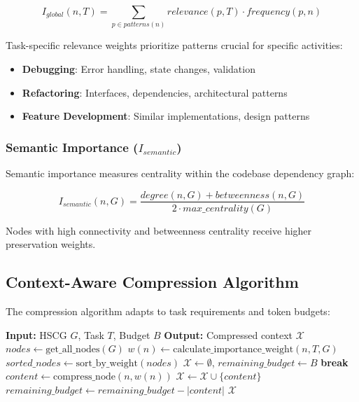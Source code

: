 \documentclass[conference]{IEEEtran}
\begin{document}
\begin{equation}
I_{global}(n, T) = \sum_{p \in patterns(n)} relevance(p, T) \cdot frequency(p, n)
\end{equation}

Task-specific relevance weights prioritize patterns crucial for specific activities:
\begin{itemize}
    \item \textbf{Debugging}: Error handling, state changes, validation
    \item \textbf{Refactoring}: Interfaces, dependencies, architectural patterns
    \item \textbf{Feature Development}: Similar implementations, design patterns
\end{itemize}

\subsubsection{Semantic Importance ($I_{semantic}$)}
Semantic importance measures centrality within the codebase dependency graph:

\begin{equation}
I_{semantic}(n, G) = \frac{degree(n, G) + betweenness(n, G)}{2 \cdot max\_centrality(G)}
\end{equation}

Nodes with high connectivity and betweenness centrality receive higher preservation weights.

\subsection{Context-Aware Compression Algorithm}

The compression algorithm adapts to task requirements and token budgets:

\begin{algorithm}
\caption{Context-Aware Compression}
\label{alg:compression}
\begin{algorithmic}[1]
\STATE \textbf{Input:} HSCG $G$, Task $T$, Budget $B$
\STATE \textbf{Output:} Compressed context $\mathcal{X}$
\STATE $nodes \leftarrow \text{get\_all\_nodes}(G)$
    \STATE $w(n) \leftarrow \text{calculate\_importance\_weight}(n, T, G)$
\ENDFOR
\STATE $sorted\_nodes \leftarrow \text{sort\_by\_weight}(nodes)$
\STATE $\mathcal{X} \leftarrow \emptyset$, $remaining\_budget \leftarrow B$
        \STATE \textbf{break}
    \ENDIF
    \STATE $content \leftarrow \text{compress\_node}(n, w(n))$
        \STATE $\mathcal{X} \leftarrow \mathcal{X} \cup \{content\}$
        \STATE $remaining\_budget \leftarrow remaining\_budget - |content|$
    \ENDIF
\ENDFOR
\RETURN $\mathcal{X}$
\end{algorithmic}
\end{algorithm}
\end{document}

